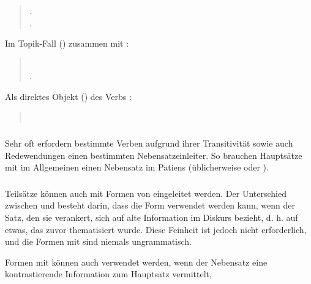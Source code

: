 \begin{quotation}
	\noindent{}.\\
	\indent{}.
\end{quotation}

\noindent Im Topik-Fall () zusammen mit :
\begin{quotation}
	\noindent{}\\
	\indent{}.
\end{quotation}

\noindent Als direktes Objekt () des Verbs :
\begin{quotation}
	\noindent{}\\
	\indent{}
\end{quotation}

\subsubsection{} Sehr oft erfordern bestimmte Verben aufgrund ihrer Transitivität sowie auch Redewendungen einen bestimmten Nebensatzeinleiter. So brauchen Hauptsätze mit   im Allgemeinen einen Nebensatz im Patiens (üblicherweise  oder ).

\subsubsection{} Teilsätze können auch mit Formen von  eingeleitet werden. Der Unterschied zwischen  und  besteht darin, dass die Form  verwendet werden kann, wenn der Satz, den sie verankert, sich auf alte Information im Diskurs bezieht, d. h. auf etwas, das zuvor thematisiert wurde. Diese Feinheit ist jedoch nicht erforderlich, und die Formen mit  sind niemals ungrammatisch. 

Formen mit  können auch verwendet werden, wenn der Nebensatz eine kontrastierende Information zum Hauptsatz vermittelt,

